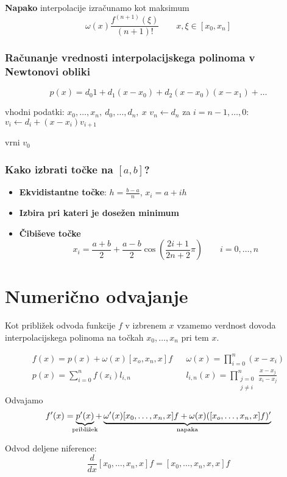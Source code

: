 \begin{multicols}{5}
\textbf{Napako} interpolacije izračunamo kot maksimum
\[\omega(x) \frac{f^{(n+1)}(\xi)}{(n+1)!} \qquad x, \xi \in [x_0, x_n]\]

\subsubsection*{Računanje vrednosti interpolacijskega polinoma v Newtonovi obliki}
\[ p(x) = d_0 1 + d_1(x-x_0) + d_2(x-x_0)(x-x_1) + \dots \]

\begin{koda}
vhodni podatki: $x_0, \dots, x_n, \ d_0, \dots, d_n, \ x$
$v_n \leftarrow d_n$
za $i = n-1, \dots, 0$:
    $v_i \leftarrow d_i + (x-x_i) v_{i+1}$

vrni $v_0$
\end{koda}

\subsubsection*{Kako izbrati točke na $[a,b]$?}
\begin{itemize}
    \item \textbf{Ekvidistantne točke}: $h = \frac{b-a}{n}$, $x_i = a + ih$
    \item \textbf{Izbira pri kateri je dosežen minimum}
    \item \textbf{Čibiševe točke}
    \[ x_i = \frac{a+b}{2} + \frac{a-b}{2}\cos\left(\frac{2i+1}{2n+2} \pi\right) \qquad i = 0, \dots, n\]
\end{itemize}


\section*{Numerično odvajanje}
Kot približek odvoda funkcije $f$ v izbrenem $x$ vzamemo verdnost dovoda interpolacijskega
polinoma na točkah $x_0, \dots, x_n$ pri tem $x$.

\begin{align*}
    f(x) = p(x) + \omega(x)[x_o, x_n, x]f && \omega(x) = \prod_{i=0}^n (x-x_i) \\
    p(x) = \sum_{i=0}^n f(x_i) l_{i,n} && l_{i,n}(x) = \prod_{\substack{j=0 \\ j \neq i}}^n \frac{x-x_j}{x_i - x_j}
\end{align*}
Odvajamo 
\[
f'(x) = 
\underbrace{p'(x)}_{\mathclap{\text{približek}}} + 
\underbrace{\omega'(x)[x_0, \dots, x_n, x] f + \omega(x)([x_o, \dots, x_n, x] f)'}_{\text{napaka}}
\]

Odvod deljene niference:
\[ \frac{d}{dx} [x_0, \dots, x_n, x] f = [x_0, \dots, x_n, x, x] f\]


\end{multicols}

